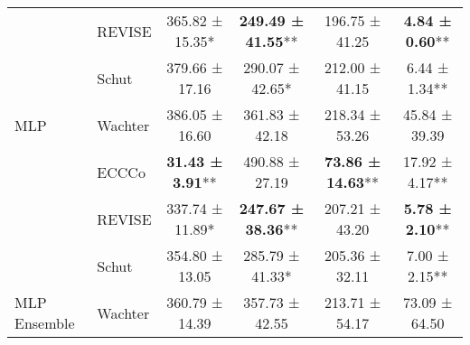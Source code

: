 \begin{table}
{\begin{tabular}[t]{llcccc}
 & REVISE & 365.82 ± 15.35*\hphantom{*} & \textbf{249.49 ± 41.55}** & 196.75 ± 41.25\hphantom{*}\hphantom{*} & \textbf{4.84 ± 0.60}**\\

 & Schut & 379.66 ± 17.16\hphantom{*}\hphantom{*} & 290.07 ± 42.65*\hphantom{*} & 212.00 ± 41.15\hphantom{*}\hphantom{*} & 6.44 ± 1.34**\\

\multirow{-4}{*}{\raggedright\arraybackslash MLP} & Wachter & 386.05 ± 16.60\hphantom{*}\hphantom{*} & 361.83 ± 42.18\hphantom{*}\hphantom{*} & 218.34 ± 53.26\hphantom{*}\hphantom{*} & 45.84 ± 39.39\hphantom{*}\hphantom{*}\\
\cmidrule{1-6}
 & ECCCo & \textbf{31.43 ± 3.91}** & 490.88 ± 27.19\hphantom{*}\hphantom{*} & \textbf{73.86 ± 14.63}** & 17.92 ± 4.17**\\

 & REVISE & 337.74 ± 11.89*\hphantom{*} & \textbf{247.67 ± 38.36}** & 207.21 ± 43.20\hphantom{*}\hphantom{*} & \textbf{5.78 ± 2.10}**\\

 & Schut & 354.80 ± 13.05\hphantom{*}\hphantom{*} & 285.79 ± 41.33*\hphantom{*} & 205.36 ± 32.11\hphantom{*}\hphantom{*} & 7.00 ± 2.15**\\

\multirow{-4}{*}{\raggedright\arraybackslash MLP Ensemble} & Wachter & 360.79 ± 14.39\hphantom{*}\hphantom{*} & 357.73 ± 42.55\hphantom{*}\hphantom{*} & 213.71 ± 54.17\hphantom{*}\hphantom{*} & 73.09 ± 64.50\hphantom{*}\hphantom{*}\\
\bottomrule
\end{tabular}}
\end{table}
